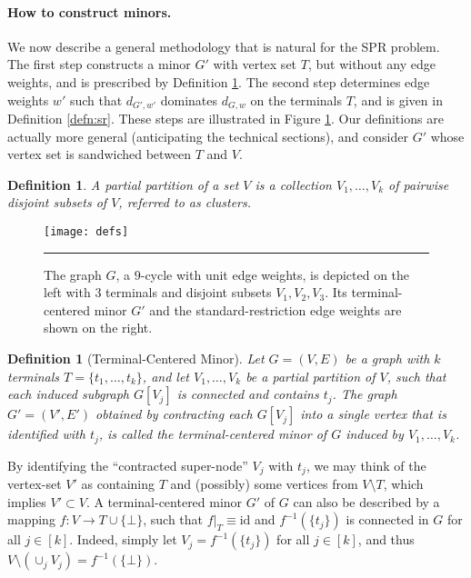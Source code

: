 \documentclass[twoside,leqno,twocolumn]{article}
\newtheorem{definition}[Definition]{Definition}
\newtheorem{definition}[theorem]{Definition}
\providecommand{\aset}[1]{\{#1\}}
\begin{document}
\paragraph{How to construct minors.}

We now describe a general methodology that is natural for the SPR problem.
The first step constructs a minor $G'$ with vertex set $T$, 
but without any edge weights,
and is prescribed by Definition \ref{defn:tcm}.
The second step determines edge weights $w'$ 
such that $d_{G',w'}$ dominates $d_{G,w}$ on the terminals $T$,
and is given in Definition \ref{defn:sr}.
These steps are illustrated in Figure \ref{fig:defs}.
Our definitions are actually more general (anticipating the technical sections),
and consider $G'$ whose vertex set is sandwiched between $T$ and $V$.
\begin{definition}
A \emph{partial partition} of a set $V$ is a collection $V_1,\ldots,V_k$ 
of pairwise disjoint subsets of $V$, referred to as {\em clusters}.
\end{definition}

\begin{figure}[ht]
  \begin{center}
    \label{fig:defs}
    \texttt{[image: defs]}
    \caption{The graph $G$, a $9$-cycle with unit edge weights, 
is depicted on the left with $3$ terminals and disjoint subsets $V_1,V_2,V_3$. 
Its terminal-centered minor $G'$ and the standard-restriction 
edge weights are shown on the right.}
  \end{center}
\hrule
\end{figure}

\begin{definition}[Terminal-Centered Minor] \label{defn:tcm}
Let $G=(V,E)$ be a graph with $k$ terminals $T=\aset{t_1,\ldots,t_k}$,
and let $V_1,\ldots,V_k$ be a partial partition of $V$, 
such that each induced subgraph $G[V_j]$ is connected and contains $t_j$.
The graph $G'=(V',E')$ obtained by contracting each $G[V_j]$ 
into a single vertex that is identified with $t_j$, 
is called the {\em terminal-centered minor} of $G$ induced by $V_1,\ldots,V_k$.
\end{definition}

By identifying the ``contracted super-node'' $V_j$ with $t_j$, 
we may think of the vertex-set $V'$ as containing $T$
and (possibly) some vertices from $V\setminus T$,
which implies $V'\subset V$.
A terminal-centered minor $G'$ of $G$ 
can also be described by a mapping $f:V\to T\cup\{\bot\}$, 
such that $f|_T\equiv\mathrm{id}$ 
and $f^{-1}(\{t_j\})$ is connected in $G$ for all $j \in [k]$.
Indeed, simply let $V_j = f^{-1}(\{t_j\})$ for all $j \in [k]$, 
and thus $V \setminus \left(\cup_jV_j\right) = f^{-1}(\{\bot\})$. 
\end{document}
